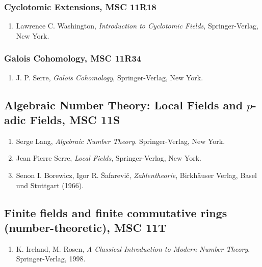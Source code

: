 \documentclass[12pt]{article}
\begin{document}
\subsubsection*{Cyclotomic Extensions, MSC 11R18}
\begin{enumerate}
\item Lawrence C. Washington, {\em Introduction to Cyclotomic Fields}, Springer-Verlag, New York.
\end{enumerate}

\subsubsection*{Galois Cohomology, MSC 11R34}
\begin{enumerate}
\item J. P. Serre, {\em Galois Cohomology}, Springer-Verlag, New York.
\end{enumerate}

\subsection*{Algebraic Number Theory: Local Fields and $p$-adic Fields, MSC 11S}
\begin{enumerate}
\item Serge Lang, {\em Algebraic Number Theory}. Springer-Verlag, New York.

\item Jean Pierre Serre, {\em Local Fields}, Springer-Verlag, New York. 

\item Senon I. Borewicz, Igor R. \v{S}afarevi\v{c}, {\em Zahlentheorie}, Birkh\"auser Verlag, Basel und Stuttgart (1966).
\end{enumerate}

\subsection*{Finite fields and finite commutative rings (number-theoretic), MSC 11T}
\begin{enumerate}
\item K. Ireland, M. Rosen, {\em A Classical Introduction to Modern Number Theory}, Springer-Verlag, 1998.
\end{enumerate}
\end{document}
